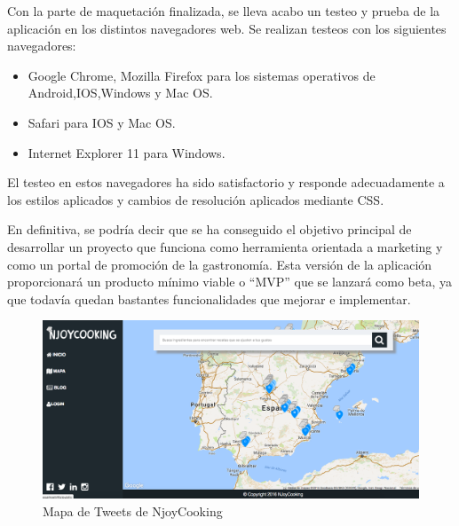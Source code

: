 Con la parte de maquetación finalizada, se lleva acabo un testeo y prueba de la aplicación en los distintos navegadores web. Se realizan testeos con los siguientes
navegadores:

\begin{itemize}
\item Google Chrome, Mozilla Firefox para los sistemas operativos de Android,IOS,Windows y Mac OS.
\item Safari para IOS y Mac OS.
\item Internet Explorer 11 para Windows.
\end{itemize}

El testeo en estos navegadores ha sido satisfactorio y responde adecuadamente a los estilos aplicados y cambios de resolución aplicados mediante CSS.

En definitiva, se podría decir que se ha conseguido el objetivo principal de desarrollar un proyecto que funciona como herramienta orientada a marketing y como un portal de promoción de la gastronomía. Esta versión de la aplicación proporcionará un producto mínimo viable o ``MVP'' que se lanzará como beta, ya que todavía quedan bastantes funcionalidades que mejorar e implementar.

\begin{figure}
\begin{center}
\includegraphics[width=1.0\textwidth]{imagenes/map-resultado.png}
\caption{Mapa de Tweets de NjoyCooking}
\label{map-resultado}
\end{center}
\end{figure}

